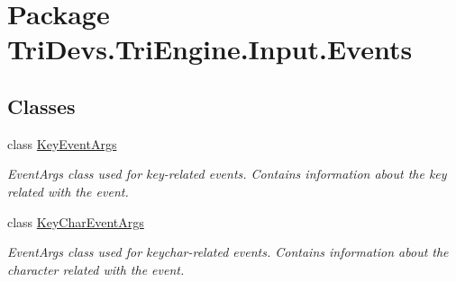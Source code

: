 \hypertarget{namespace_tri_devs_1_1_tri_engine_1_1_input_1_1_events}{\section{Package Tri\-Devs.\-Tri\-Engine.\-Input.\-Events}
\label{namespace_tri_devs_1_1_tri_engine_1_1_input_1_1_events}
}
\subsection*{Classes}
\begin{DoxyCompactItemize}
\item 
class \hyperlink{class_tri_devs_1_1_tri_engine_1_1_input_1_1_events_1_1_key_event_args}{Key\-Event\-Args}
\begin{DoxyCompactList}\small\item\em Event\-Args class used for key-\/related events. Contains information about the key related with the event. \end{DoxyCompactList}\item 
class \hyperlink{class_tri_devs_1_1_tri_engine_1_1_input_1_1_events_1_1_key_char_event_args}{Key\-Char\-Event\-Args}
\begin{DoxyCompactList}\small\item\em Event\-Args class used for keychar-\/related events. Contains information about the character related with the event. \end{DoxyCompactList}\end{DoxyCompactItemize}
